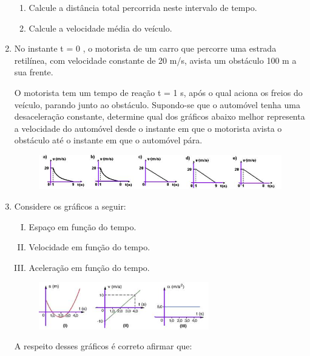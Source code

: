 \documentclass[12pt,letterpaper,fleqn]{article}
\begin{document}
\begin{enumerate}
    \begin{enumerate}
        \item Calcule a distância total percorrida neste intervalo de tempo.
        \item Calcule a velocidade média do veículo.
    \end{enumerate}
    
    \item No instante t = 0 , o motorista de um carro que percorre uma estrada retilínea, com velocidade constante de 20 m/s, avista um obstáculo 100 m a sua frente.
    
    O motorista tem um tempo de reação t = 1 s, após o qual aciona os freios do veículo, parando junto ao obstáculo. Supondo-se que o automóvel tenha uma desaceleração constante, determine qual dos gráficos abaixo melhor representa a velocidade do automóvel desde o instante em que o motorista avista o obstáculo até o instante em que o automóvel pára.
    \begin{figure}[H]
        \centering
        \includegraphics[width=\textwidth]{ex_8.jpg}
        \label{fig:ex_8}
    \end{figure}
    
    \item Considere os gráficos a seguir:
    \begin{enumerate}[I.]
            \item Espaço em função do tempo.
            \item Velocidade em função do tempo.
            \item Aceleração em função do tempo.
    \end{enumerate}
    
    \begin{figure}[H]
        \centering
        \includegraphics[width=0.7\textwidth]{i_a7a9ebcce6cda076_html_4c31708 (1).jpg}
        \label{fig:ex_9}
    \end{figure}
    A respeito desses gráficos é correto afirmar que:
    

\end{enumerate}
\end{document}
